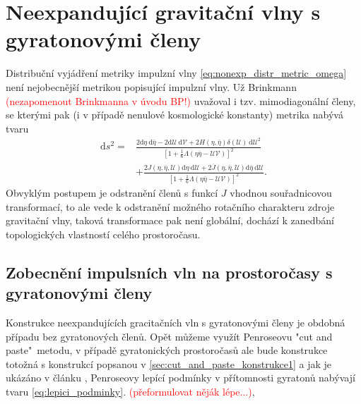 \chapter{Neexpandující gravitační vlny s gyratonovými členy}
Distribuční vyjádření metriky impulzní vlny \eqref{eq:nonexp_distr_metric_omega} není nejobecnější metrikou popisující
impulzní vlny. Už Brinkmann \textcolor{red}{(nezapomenout Brinkmanna v úvodu BP!)} uvažoval i tzv. mimodiagonální členy, se kterými pak (i v případě nenulové kosmologické konstanty)
metrika nabývá tvaru
\begin{equation}
    \label{eq:nonexp_gyra_distrib_metric_omega}
    \begin{split}
        \mathrm{d}s^2=&\frac{2\mathrm{d}\eta~\mathrm{d}\bar{\eta} - 2 \mathrm{d}\mathcal{U}~\mathrm{d}\mathcal{V} + 2H(\eta, \bar{\eta}) \delta(\mathcal{U}) 
        ~\mathrm{d}\mathcal{U}^2}{\left[1+\frac{1}{6}\Lambda(\eta \bar{\eta}-\mathcal{U}\mathcal{V})\right]^2} \\
        &+ \frac{2J\left(\eta, \bar{\eta}, \mathcal{U}\right) \mathrm{d}\eta~\mathrm{d}\mathcal{U}
        +2\overline{J}\left(\eta, \bar{\eta}, \mathcal{U}\right) \mathrm{d}\bar{\eta}~\mathrm{d}\mathcal{U}}{\left[1+\frac{1}{6}\Lambda(\eta \bar{\eta}-\mathcal{U}\mathcal{V})\right]^2}.
    \end{split}
\end{equation}
Obvyklým postupem je odstranění členů s funkcí $J$ vhodnou souřadnicovou transformací, to ale vede k odstranění
možného rotačního charakteru zdroje gravitační vlny, taková transformace pak není globální, dochází k
zanedbání topologických vlastností celého prostoročasu.

\section{Zobecnění impulsních vln na prostoročasy s gyratonovými členy}
Konstrukce neexpandujících gracitačních vln s gyratonovými členy je obdobná případu bez gyratonových
členů. Opět můžeme využít Penroseovu "cut and paste"\ metodu, v případě gyratonických prostoročasů ale bude
konstrukce totožná s konstrukcí popsanou v \eqref{sec:cut_and_paste_konstrukce1} a jak je ukázáno v článku \cite{Podolsky_2017}, Penroseovy lepící podmínky 
v přítomnosti gyratonů nabývají tvaru \eqref{eq:lepici_podminky}. \textcolor{red}{(přeformulovat něják lépe...)},

